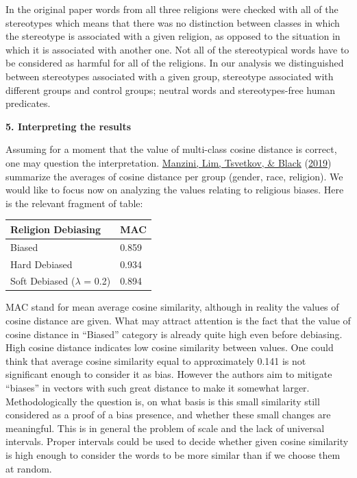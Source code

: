 \documentclass[
  12pt,
]{book}
\begin{document}
In the original paper words from all three religions were checked with all of the stereotypes which means that there was no distinction between classes in which the stereotype is associated with a given religion, as opposed to the situation in which it is associated with another one. Not all of the stereotypical words have to be considered as harmful for all of the religions. In our analysis we distinguished between stereotypes associated with a given group, stereotype associated with different groups and control groups; neutral words and stereotypes-free human predicates.

\textbf{5. Interpreting the results}

Assuming for a moment that the value of multi-class cosine distance is correct, one may question the interpretation. \protect\hyperlink{ref-Manzini2019blackToCriminal}{Manzini, Lim, Tsvetkov, \& Black} (\protect\hyperlink{ref-Manzini2019blackToCriminal}{2019}) summarize the averages of cosine distance per group (gender, race, religion). We would like to focus now on analyzing the values relating to religious biases. Here is the relevant fragment of table:

\begin{longtable}[]{@{}ll@{}}
\toprule
Religion Debiasing & MAC \\
\midrule
\endhead
Biased & 0.859 \\
Hard Debiased & 0.934 \\
Soft Debiased (\(\lambda\) = 0.2) & 0.894 \\
\bottomrule
\end{longtable}

MAC stand for mean average cosine similarity, although in reality the values of cosine distance are given. What may attract attention is the fact that the value of cosine distance in ``Biased'' category is already quite high even before debiasing. High cosine distance indicates low cosine similarity between values. One could think that average cosine similarity equal to approximately 0.141 is not significant enough to consider it as bias. However the authors aim to mitigate ``biases'' in vectors with such great distance to make it somewhat larger. Methodologically the question is, on what basis is this small similarity still considered as a proof of a bias presence, and whether these small changes are meaningful. This is in general the problem of scale and the lack of universal intervals. Proper intervals could be used to decide whether given cosine similarity is high enough to consider the words to be more similar than if we choose them at random.
\end{document}
